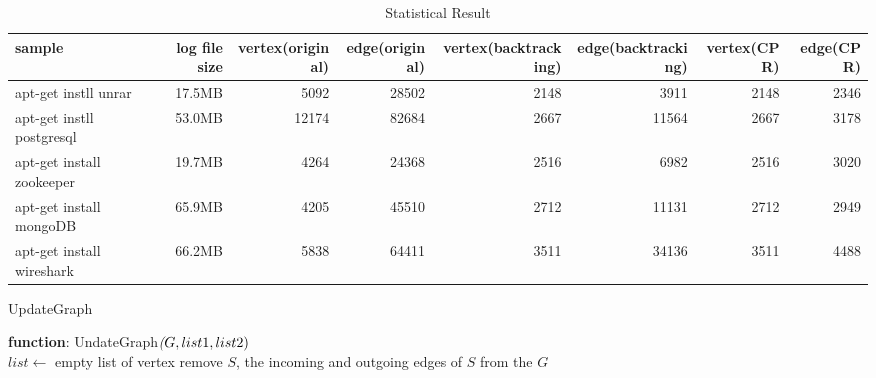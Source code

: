 \begin{table}[!hp]
	\centering
	\caption{Statistical Result}
	\label{my-label}
	\begin{scriptsize}
		\begin{tabular}{|l|r|r|r|r|r|r|r|}
			\hline
			sample                    & log file size & vertex(original) & edge(original) & vertex(backtracking) & edge(backtracking) & vertex(CPR) & edge(CPR) \\ \hline
			apt-get instll unrar      & 17.5MB        & 5092             & 28502          & 2148                 & 3911               & 2148        & 2346      \\ \hline
			apt-get instll postgresql & 53.0MB        & 12174            & 82684          & 2667                 & 11564              & 2667        & 3178      \\ \hline
			apt-get install zookeeper & 19.7MB        & 4264             & 24368          & 2516                 & 6982               & 2516        & 3020      \\ \hline
			apt-get install mongoDB   & 65.9MB        & 4205             & 45510          & 2712                 & 11131              & 2712        & 2949      \\ \hline
			apt-get install wireshark & 66.2MB        & 5838             & 64411          & 3511                 & 34136              & 3511        & 4488      \\ \hline
		\end{tabular}%
	\end{scriptsize}
	
\end{table}

\begin{algorithm}
	\caption{UpdateGraph}
	\textbf{function}: UndateGraph$\textit(G, list1, list2)$\\
	$list \leftarrow$ empty list of vertex\;
	remove $S$, the incoming and outgoing edges of $S$ from the $G$\;
	\label{alg:update}
\end{algorithm}



